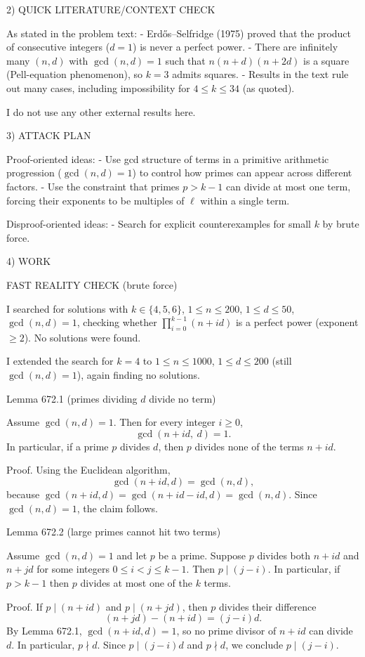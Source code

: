 2) QUICK LITERATURE/CONTEXT CHECK

As stated in the problem text:
- Erd\H{o}s--Selfridge (1975) proved that the product of consecutive integers ($d=1$) is never a perfect power.
- There are infinitely many $(n,d)$ with $\gcd(n,d)=1$ such that $n(n+d)(n+2d)$ is a square (Pell-equation phenomenon), so $k=3$ admits squares.
- Results in the text rule out many cases, including impossibility for $4\le k\le 34$ (as quoted).

I do not use any other external results here.

3) ATTACK PLAN

Proof-oriented ideas:
- Use gcd structure of terms in a primitive arithmetic progression ($\gcd(n,d)=1$) to control how primes can appear across different factors.
- Use the constraint that primes $p>k-1$ can divide at most one term, forcing their exponents to be multiples of $\ell$ within a single term.

Disproof-oriented ideas:
- Search for explicit counterexamples for small $k$ by brute force.

4) WORK

FAST REALITY CHECK (brute force)

I searched for solutions with $k\in\{4,5,6\}$, $1\le n\le 200$, $1\le d\le 50$, $\gcd(n,d)=1$, checking whether $\prod_{i=0}^{k-1}(n+id)$ is a perfect power (exponent $\ge2$). No solutions were found.

I extended the search for $k=4$ to $1\le n\le 1000$, $1\le d\le 200$ (still $\gcd(n,d)=1$), again finding no solutions.

Lemma 672.1 (primes dividing $d$ divide no term)

Assume $\gcd(n,d)=1$. Then for every integer $i\ge 0$,
\[
\gcd(n+id,\ d)=1.
\]
In particular, if a prime $p$ divides $d$, then $p$ divides none of the terms $n+id$.

Proof.
Using the Euclidean algorithm,
\[
\gcd(n+id,d)=\gcd(n,d),
\]
because $\gcd(n+id,d)=\gcd(n+id-id,d)=\gcd(n,d)$. Since $\gcd(n,d)=1$, the claim follows.


Lemma 672.2 (large primes cannot hit two terms)

Assume $\gcd(n,d)=1$ and let $p$ be a prime. Suppose $p$ divides both $n+id$ and $n+jd$ for some integers $0\le i<j\le k-1$. Then $p\mid (j-i)$. In particular, if $p>k-1$ then $p$ divides at most one of the $k$ terms.

Proof.
If $p\mid(n+id)$ and $p\mid(n+jd)$, then $p$ divides their difference
\[
(n+jd)-(n+id)=(j-i)d.
\]
By Lemma 672.1, $\gcd(n+id,d)=1$, so no prime divisor of $n+id$ can divide $d$. In particular, $p\nmid d$. Since $p\mid (j-i)d$ and $p\nmid d$, we conclude $p\mid (j-i)$.


